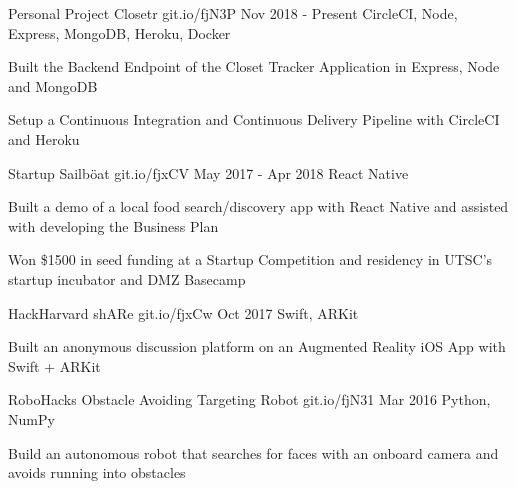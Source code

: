 \begin{cventries}
\cventry
    {Personal Project}
    {Closetr}
    {git.io/fjN3P}
    {Nov 2018 - Present}
    {CircleCI, Node, Express, MongoDB, Heroku, Docker}
    {
      \begin{cvitems}
        \item{Built the Backend Endpoint of the Closet Tracker Application in Express, Node and MongoDB}
        \item{Setup a Continuous Integration and Continuous Delivery Pipeline with CircleCI and Heroku}
      \end{cvitems}
    }
\cventry
  {Startup}
  {Sailböat}
  {git.io/fjxCV}
  {May 2017 - Apr 2018}
  {React Native}
  {
    \begin{cvitems}
      \item {Built a demo of a local food search/discovery app with React Native and assisted with developing the Business Plan}
      \item {Won \$1500 in seed funding at a Startup Competition and residency in UTSC's startup incubator and DMZ Basecamp}
    \end{cvitems}
  }
\cventry
  {HackHarvard}
  {shARe}
  {git.io/fjxCw}
  {Oct 2017}
  {Swift, ARKit}
  {
    \begin{cvitems}
      \item {Built an anonymous discussion platform on an Augmented Reality iOS App with Swift + ARKit}
    \end{cvitems}
  }
\cventry
  {RoboHacks}
  {Obstacle Avoiding Targeting Robot}
  {git.io/fjN31}
  {Mar 2016}
  {Python, NumPy}
  {
    \begin{cvitems}
      \item {Build an autonomous robot that searches for faces with an onboard camera and avoids running into obstacles}
    \end{cvitems}
  }
\end{cventries}
